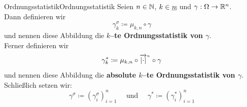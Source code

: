 \begin{definition}{Ordnungsstatistik}{Ordnungsstatistik}
Seien $n\in \mathbb{N}$, $k \in \haken n$ und $\gamma: \Omega \rightarrow \mathbb{R}^n$.\\
Dann definieren wir
\[ \gamma^\sigma_k\coloneqq  \mu_{k,n}\circ \gamma \]
und nennen diese Abbildung die \textbf{$k$--te Ordnungsstatistik von $\gamma$}.
\\Ferner definieren wir
\[ \gamma_k^\ast \coloneqq  \mu_{k,n} \circ {\overrightarrow{\left|\cdot\right|}}^{{}_n} \circ \gamma\]
und nennen diese Abbildung die \textbf{absolute $k$--te Ordnungsstatistik von
$\gamma$}.\\
Schließlich setzen wir:
\[ \gamma ^\sigma \coloneqq  \left(\gamma^\sigma_i \right)_{i=1}^n\quad
\text{ und }\quad \gamma^\ast \coloneqq  \left(\gamma^\ast_i \right)_{i=1}^n\]
\end{definition}